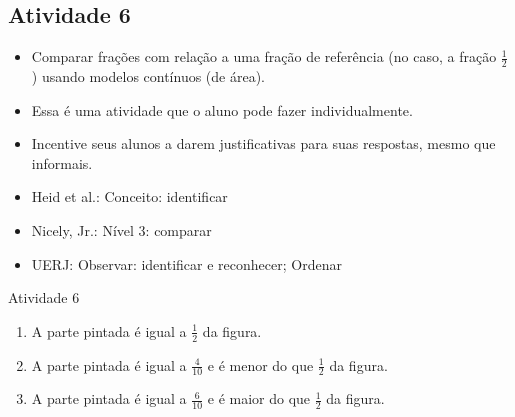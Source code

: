\newpage
\begin{multicols}{2}
\subsection{Atividade 6}

  \vspace{.1cm}

\begin{itemize} %
    \item       Comparar frações com relação a uma fração de referência (no caso, a fração       $\frac{1}{2}$) usando modelos contínuos (de área).
\end{itemize} %


  \vspace{.1cm}

  \vspace{.1cm}

  \begin{itemize} %
    \item       Essa é uma atividade que o aluno pode fazer individualmente.
    \item       Incentive seus alunos a darem justificativas para suas respostas, mesmo que informais.
\end{itemize} %


  \vspace{.1cm}

 \vspace{.1cm}
\begin{itemize} %
    \item       Heid et al.: Conceito: identificar
    \item       Nicely, Jr.: Nível 3: comparar
    \item       UERJ: Observar: identificar e reconhecer; Ordenar
\end{itemize} %

\begin{resposta*}{Atividade 6}
\begin{enumerate} [\quad a)] %
    \item       A parte pintada é igual a       $\frac{1}{2}$ da figura.
    \item       A parte pintada é igual a       $\frac{4}{10}$ e é menor do que       $\frac{1}{2}$ da figura.
    \item       A parte pintada é igual a       $\frac{6}{10}$ e é maior do que       $\frac{1}{2}$ da figura.
\end{enumerate} %


\end{resposta*}
\end{multicols}
